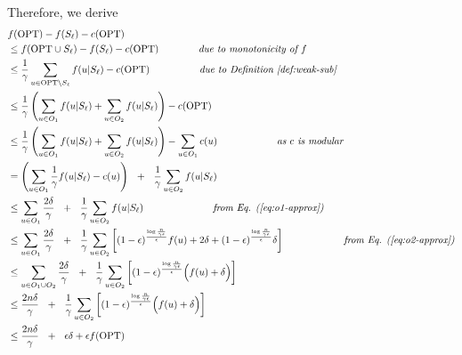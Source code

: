 \documentclass[10pt]{article} %
\theoremstyle{remark}
\newcommand{\OPT}{{\rm OPT}}
\begin{document}
    Therefore, we derive
    \begin{align*}
        &f(\OPT)-f(S_\ell)-c(\OPT) \\
        &\leq f(\OPT \cup S_\ell)-f(S_\ell)-c(\OPT) \quad \quad\quad \quad \mbox{\it due to monotonicity of $f$}\\
        &\leq \frac{1}{\gamma}\sum_{u \in \OPT \setminus S_{\ell}} f(u|S_\ell)-c(\OPT) \quad \quad\quad \quad \quad \mbox{\it due to Definition~\ref{def:weak-sub}}\\
        &\leq \frac{1}{\gamma}\left(\sum_{u \in O_1} f(u|S_\ell)+\sum_{u \in O_2} f(u|S_\ell)\right)-c(\OPT)\\
        &\leq \frac{1}{\gamma}\left(\sum_{u \in O_1} f(u|S_\ell)+\sum_{u \in O_2} f(u|S_\ell)\right)-\sum_{u \in O_1} c(u) \quad \quad\quad \quad\quad \quad \mbox{\it as $c$ is modular}\\
        &=\left(\sum_{u \in O_1} \frac{1}{\gamma} f(u|S_\ell) - c(u)\right)~~+~~\frac{1}{\gamma}\sum_{u \in O_2} f(u|S_\ell)\\
        &\leq \sum_{u \in O_1} \frac{2\delta}{\gamma} ~~+~~ \frac{1}{\gamma} \sum_{u \in O_2} f(u|S_\ell) \quad \quad \quad\quad \quad\quad \quad \mbox{\it from Eq. (\ref{eq:o1-approx})}\\
        &\leq \sum_{u \in O_1} \frac{2\delta}{\gamma} ~~+~~ \frac{1}{\gamma} \sum_{u \in O_2}\left[ (1-\epsilon)^{\frac{\log \frac{n}{\gamma \epsilon}}{\epsilon}}f(u) + 2\delta +  (1-\epsilon)^{\frac{\log \frac{n}{\gamma \epsilon}}{\epsilon}} \delta \right] \quad \quad\quad\quad \quad \quad \mbox{\it from Eq. (\ref{eq:o2-approx})}\\
        &\leq \sum_{u \in O_1 \cup O_2} \frac{2\delta}{\gamma} ~~+~~ \frac{1}{\gamma} \sum_{u \in O_2}\left[ (1-\epsilon)^{\frac{\log \frac{n}{\gamma \epsilon}}{\epsilon}}\Big(f(u) + \delta \Big) \right]\\
        &\leq \frac{2n\delta}{\gamma} ~~+~~ \frac{1}{\gamma} \sum_{u \in O_2}\left[ (1-\epsilon)^{\frac{\log \frac{n}{\gamma \epsilon}}{\epsilon}}\Big(f(u) + \delta \Big) \right]\\
        &\leq \frac{2n\delta}{\gamma} ~~+~~  \epsilon \delta+ \epsilon f(\OPT) 
    \end{align*}
\end{document}
